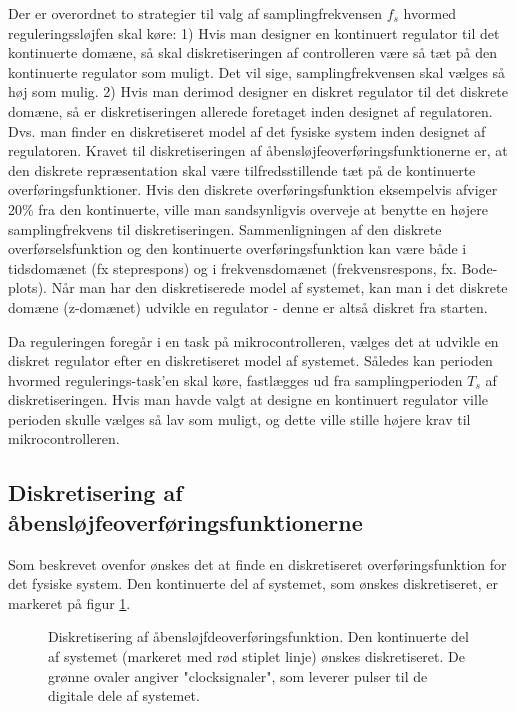 Der er overordnet to strategier til valg af samplingfrekvensen \(f_s\) hvormed
reguleringssløjfen skal køre:
1) Hvis man designer en kontinuert regulator til det kontinuerte domæne, så
skal diskretiseringen af controlleren være så tæt på den kontinuerte regulator som muligt.
Det vil sige, samplingfrekvensen skal vælges så høj som mulig.
2) Hvis man derimod designer en diskret regulator til det diskrete domæne,
så er diskretiseringen allerede foretaget inden designet af regulatoren.
Dvs. man finder en diskretiseret model af det fysiske system inden designet af regulatoren.
Kravet til diskretiseringen af åbensløjfeoverføringsfunktionerne er, at den diskrete repræsentation
skal være tilfredsstillende tæt på de kontinuerte overføringsfunktioner.
Hvis den diskrete overføringsfunktion eksempelvis afviger 20\% fra den kontinuerte, ville man
sandsynligvis overveje at benytte en højere samplingfrekvens til diskretiseringen.
Sammenligningen af den diskrete overførselsfunktion og den kontinuerte overføringsfunktion
kan være både i tidsdomænet (fx steprespons) og i frekvensdomænet (frekvensrespons, fx. Bode-plots).
Når man har den diskretiserede model af systemet, kan man i det diskrete domæne (z-domænet)
udvikle en regulator - denne er altså diskret fra starten.

Da reguleringen foregår i en task på mikrocontrolleren, vælges det
at udvikle en diskret regulator efter en diskretiseret model af systemet.
Således kan perioden hvormed regulerings-task'en skal køre, fastlægges ud fra
samplingperioden \(T_s\) af diskretiseringen. Hvis man havde valgt at designe en kontinuert regulator
ville perioden skulle vælges så lav som muligt, og dette ville stille højere krav
til mikrocontrolleren.

\subsection{Diskretisering af åbensløjfeoverføringsfunktionerne}
Som beskrevet ovenfor ønskes det at finde en diskretiseret overføringsfunktion
for det fysiske system. Den kontinuerte del af systemet, som ønskes diskretiseret,
er markeret på figur \ref{fig:digitalkontroller2}.
\begin{figure}[!th]
\centering
\begin{tikzpicture}[scale=0.8, every node/.style={scale=0.8}, node distance=2.6cm, =>latex']

\end{tikzpicture}
\caption[Diskretisering af åbensløjfeoverføringsfunktion]{Diskretisering af åbensløjfdeoverføringsfunktion.
	Den kontinuerte del af systemet (markeret med rød stiplet linje) ønskes diskretiseret.
	De grønne ovaler angiver "clocksignaler", som leverer pulser til de digitale dele af systemet.}
\label{fig:digitalkontroller2}
\end{figure}

